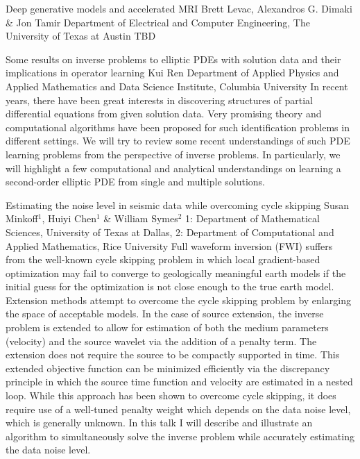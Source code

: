 \begin{addmargin}[2em]{0em}
\vspace{1.5ex}
\abs
{Deep generative models and accelerated MRI}
{Brett Levac, Alexandros G. Dimaki \& Jon Tamir}
{Department of Electrical and Computer Engineering,  The University of Texas at Austin}
{TBD}


\vspace{1.5ex}
\abs
{Some results on inverse problems to elliptic {PDE}s with solution data and their implications in operator learning}
{Kui Ren}
{Department of Applied Physics and Applied Mathematics and Data Science Institute, Columbia University}
{In recent years, there have been great interests in discovering structures of partial differential equations from given solution data. Very promising theory and computational algorithms have been proposed for such identification problems in different settings. We will try to review some recent understandings of such PDE learning problems from the perspective of inverse problems. In particularly, we will highlight a few computational and analytical understandings on learning a second-order elliptic PDE from single and multiple solutions.}


\vspace{1.5ex}
\abs
{Estimating the noise level in seismic data while overcoming cycle skipping}
{Susan Minkoff$^{1}$, Huiyi Chen$^{1}$ \& William Symes$^{2}$}
{1: Department of Mathematical Sciences, University of Texas at Dallas, 2:  Department of Computational and Applied Mathematics, Rice University}
{Full waveform inversion (FWI) suffers from the well-known cycle skipping problem in which local gradient-based optimization may fail to converge to geologically meaningful earth models if the initial guess for the optimization is not close enough to the true earth model. Extension methods attempt to overcome the cycle skipping problem by enlarging the space of acceptable models. In the case of source extension, the inverse problem is extended to allow for estimation of both the medium parameters (velocity) and the source wavelet via the addition of a penalty term. The extension does not require the source to be compactly supported in time. This extended objective function can be minimized efficiently  via the discrepancy principle in which the source time function and velocity are estimated in a nested loop. While this approach has been shown to overcome cycle skipping, it does require use of a well-tuned penalty weight which depends on the data noise level, which is generally unknown. In this talk I will describe and illustrate an algorithm to simultaneously solve the inverse problem while accurately estimating the data noise level.}



\end{addmargin}
